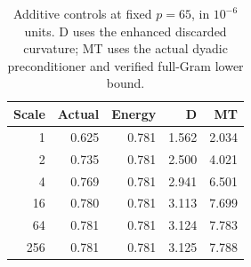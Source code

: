 \begin{table}[t]\centering\small\setlength{\tabcolsep}{3pt}
\caption{Additive controls at fixed $p=65$, in $10^{-6}$ units. D uses the enhanced discarded curvature; MT uses the actual dyadic preconditioner and verified full-Gram lower bound.}\label{tab:scale-v80}
\begin{tabular}{rrrrr}\toprule Scale&Actual&Energy&D&MT\\\midrule
1 & 0.625 & 0.781 & 1.562 & 2.034\\
2 & 0.735 & 0.781 & 2.500 & 4.021\\
4 & 0.769 & 0.781 & 2.941 & 6.501\\
16 & 0.780 & 0.781 & 3.113 & 7.699\\
64 & 0.781 & 0.781 & 3.124 & 7.783\\
256 & 0.781 & 0.781 & 3.125 & 7.788\\
\bottomrule\end{tabular}\end{table}
